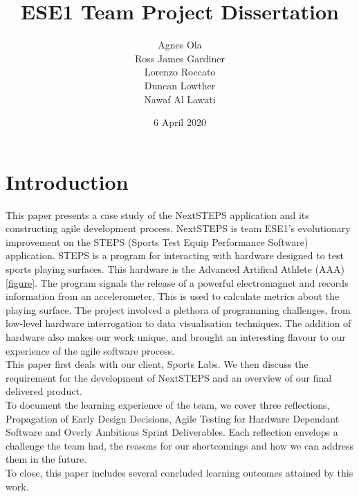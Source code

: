 \documentclass{l3proj}
\begin{document}
\title{ESE1 Team Project Dissertation}

\author{Agnes Ola \\
        Ross James Gardiner \\
        Lorenzo Roccato \\
        Duncan Lowther \\
        Nawaf Al Lawati}

\date{6 April 2020}

\maketitle

\begin{abstract}


\end{abstract}

\educationalconsent

\newpage
\section{Introduction}

This paper presents a case study of the NextSTEPS application and its constructing agile development process. NextSTEPS is team ESE1's evolutionary improvement on the STEPS (Sports Test Equip Performance Software) application. STEPS is a program for interacting with hardware designed to test sports playing surfaces. This hardware is the Advanced Artifical Athlete (AAA) \ref{figure}. The program signals the release of a powerful electromagnet and records information from an accelerometer. This is used to calculate metrics about the playing surface. The project involved a plethora of programming challenges, from low-level hardware interrogation to data visualisation techniques. The addition of hardware also makes our work unique, and brought an interesting flavour to our experience of the agile software process. 
\\
This paper first deals with our client, Sports Labs. We then discuss the requirement for the development of NextSTEPS and an overview of our final delivered product. 
\\
To document the learning experience of the team, we cover three reflections, Propagation of Early Design Decisions, Agile Testing for Hardware Dependant Software and Overly Ambitious Sprint Deliverables. Each reflection envelops a challenge the team had, the reasons for our shortcomings and how we can address them in the future. 
\\
To close, this paper includes several concluded learning outcomes attained by this work. 
\end{document}
